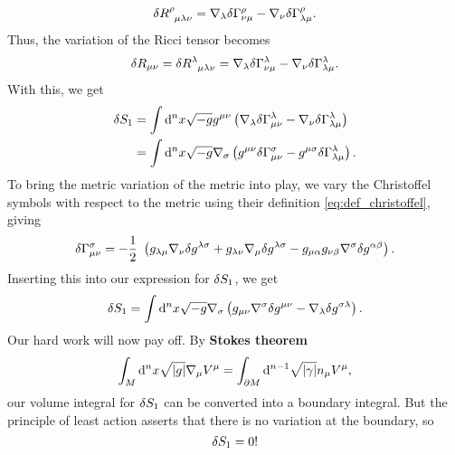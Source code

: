 \begin{equation}
	\variation{R\indices{^\rho_\mu_\lambda_\nu}} = \nabla_\lambda \variation{\Gamma^\rho_{\nu \mu}}
	                                             - \nabla_\nu \variation{\Gamma^\rho_{\lambda \mu}} .
\end{equation}
Thus, the variation of the Ricci tensor becomes
\begin{equation}
	\variation{R_{\mu \nu}} = \variation{R\indices{^\lambda_\mu_\lambda_\nu}} = \nabla_\lambda \variation{\Gamma^\lambda_{\nu \mu}}
	                                                                          - \nabla_\nu \variation{\Gamma^\lambda_{\lambda \mu}} .
\end{equation}
With this, we get
\begin{equation}
\begin{split}
	\delta S_1 &= \int \mathop{}\!\mathrm{d}^n x \sqrt{-g} g^{\mu \nu} \left( \nabla_\lambda \delta \Gamma^\lambda_{\mu \nu} - \nabla_\nu \delta \Gamma^\lambda_{\lambda \mu} \right) \\
	                &= \int \mathop{}\!\mathrm{d}^n x \sqrt{-g} \nabla_\sigma \left( g^{\mu \nu} \delta \Gamma^\sigma_{\mu \nu} - g^{\mu \sigma} \delta \Gamma^\lambda_{\lambda \mu} \right) . \\
\end{split}
\end{equation}
To bring the metric variation of the metric into play, we vary the Christoffel symbols with respect to the metric using their definition \eqref{eq:def_christoffel}, giving
\begin{equation}
	\variation{\Gamma^\sigma_{\mu \nu}} = -\frac{1}{2} \left( 
		g_{\lambda \mu} \nabla_\nu \variation{g^{\lambda \sigma}} +
		g_{\lambda \nu} \nabla_\mu \variation{g^{\lambda \sigma}} -
		g_{\mu \alpha} g_{\nu \beta} \nabla^\sigma \variation{g^{\alpha \beta}}
	\right) .
\end{equation}
Inserting this into our expression for $\delta S_1$, we get
\begin{equation}
	\delta S_1 = \int \mathop{}\!\mathrm{d}^n x \sqrt{-g} \nabla_\sigma \left( g_{\mu \nu} \nabla^\sigma \delta g^{\mu \nu} - \nabla_\lambda \delta g^{\sigma \lambda} \right).
\end{equation}
Our hard work will now pay off.
By \textbf{Stokes theorem} \cite[equation 3.35]{ref:carroll}
\begin{equation}
	\int_M \mathop{}\!\mathrm{d}^n x \sqrt{\lvert g \rvert} \nabla_\mu V^\mu = \int_{\partial M} \mathop{}\!\mathrm{d}^{n-1} \sqrt{\lvert \gamma \rvert} n_\mu V^\mu ,
\end{equation}
our volume integral for $\delta S_1$ can be converted into a boundary integral.
But the principle of least action asserts that there is no variation at the boundary, so
\begin{equation}
	\delta S_1 = 0 !
\end{equation}

